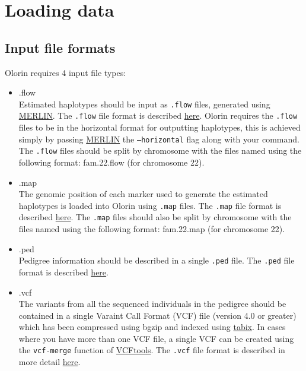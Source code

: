 \documentclass{article}
\begin{document}
\section{Loading data}
\subsection{Input file formats}
Olorin requires 4 input file types:
\begin{itemize}
	\item{.flow}\\
	Estimated haplotypes should be input as \texttt{.flow} files, generated using \href{http://www.sph.umich.edu/csg/abecasis/Merlin/}{MERLIN}. The \texttt{.flow} file format is described \href{http://www.sph.umich.edu/csg/abecasis/Merlin/tour/haplotyping.html}{here}. Olorin requires the \texttt{.flow} files to be in the horizontal format for outputting haplotypes, this is achieved simply by passing \href{http://www.sph.umich.edu/csg/abecasis/Merlin/reference.html}{MERLIN} the \texttt{--horizontal} flag along with your command. The \texttt{.flow} files should be split by chromosome with the files named using the following format: fam.22.flow (for chromosome 22).
	\item{.map}\\
	The genomic position of each marker used to generate the estimated haplotypes is loaded into Olorin using \texttt{.map} files. The \texttt{.map} file format is described \href{http://pngu.mgh.harvard.edu/~purcell/plink/data.shtml#map}{here}. The \texttt{.map} files should also be split by chromosome with the files named using the following format: fam.22.map (for chromosome 22).
	\item{.ped}\\
	Pedigree information should be described in a single \texttt{.ped} file. The \texttt{.ped} file format is described \href{http://pngu.mgh.harvard.edu/~purcell/plink/data.shtml#ped}{here}.
	\item{.vcf}\\
	The variants from all the sequenced individuals in the pedigree should be contained in a single Varaint Call Format (VCF) file (version 4.0 or greater) which has been compressed using bgzip and indexed using \href{http://samtools.sourceforge.net/tabix.shtml}{tabix}. In cases where you have more than one VCF file, a single VCF can be created using the \texttt{vcf-merge} function of \href{http://vcftools.sourceforge.net/}{VCFtools}. The \texttt{.vcf} file format is described in more detail \href{http://www.1000genomes.org/node/101}{here}.
\end{itemize}
\end{document}
